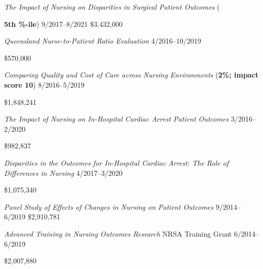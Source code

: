\documentclass[10pt,]{article}
\begin{document}
{{{{{{\textit {The Impact of Nursing on Disparities in Surgical Patient Outcomes} ({\textbf{5{\small{th} {\small{\%-ile}}}}) \hfill 9/2017--8/2021 \newline
{}	\hfill \$3,432,000

\textit {Queensland Nurse-to-Patient Ratio Evaluation} \hfill  4/2016--10/2019 \newline
{ \hfill \$570,000

\textit {Comparing Quality and Cost of Care across Nursing Environments} ({\textbf{2{\small{\%}}; impact score 10}}) \hfill 8/2016--5/2019 \newline
{	\hfill \$1,848,241

\textit {The Impact of Nursing on In-Hospital Cardiac Arrest Patient Outcomes} \hfill  3/2016--2/2020 \newline
{ \hfill \$982,837

\textit {Disparities in the Outcomes for In-Hospital Cardiac Arrest: The Role of Differences in Nursing} \hfill 4/2017--3/2020 \newline
{	\hfill \$1,075,340

\textit {Panel Study of Effects of Changes in Nursing on Patient Outcomes} \hfill 9/2014--6/2019 \newline
{}	\hfill \$2,910,781

\textit {Advanced Training in Nursing Outcomes Research} NRSA Training Grant \hfill 6/2014--6/2019 \newline
{	\hfill \$2,007,880

}}}}}}}}}}}}
\end{document}
